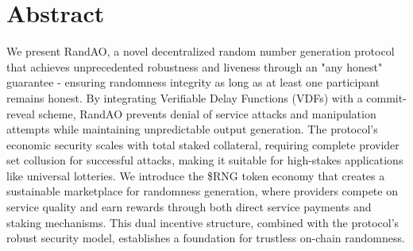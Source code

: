 \section*{Abstract}

We present RandAO, a novel decentralized random number generation protocol that achieves unprecedented robustness and liveness through an "any honest" guarantee - ensuring randomness integrity as long as at least one participant remains honest. By integrating Verifiable Delay Functions (VDFs) with a commit-reveal scheme, RandAO prevents denial of service attacks and manipulation attempts while maintaining unpredictable output generation. The protocol's economic security scales with total staked collateral, requiring complete provider set collusion for successful attacks, making it suitable for high-stakes applications like universal lotteries. We introduce the \$RNG token economy that creates a sustainable marketplace for randomness generation, where providers compete on service quality and earn rewards through both direct service payments and staking mechanisms. This dual incentive structure, combined with the protocol's robust security model, establishes a foundation for trustless on-chain randomness.
